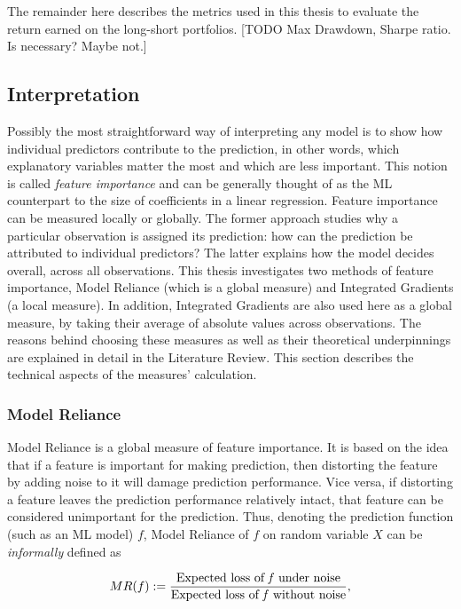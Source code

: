 			The remainder here describes the metrics used in this thesis to evaluate the return earned on the long-short portfolios. [TODO Max Drawdown, Sharpe ratio. Is necessary? Maybe not.]
	
	
	\subsection{Interpretation}
	
		Possibly the most straightforward way of interpreting any model is to show how individual predictors contribute to the prediction, in other words, which explanatory variables matter the most and which are less important. This notion is called \textit{feature importance} and can be generally thought of as the ML counterpart to the size of coefficients in a linear regression. Feature importance can be measured locally or globally. The former approach studies why a particular observation is assigned its prediction: how can the prediction be attributed to individual predictors? The latter explains how the model decides overall, across all observations. This thesis investigates two methods of feature importance, Model Reliance \citep{fisher2019all} (which is a global measure) and Integrated Gradients \citep{sundararajan2017axiomatic} (a local measure). In addition, Integrated Gradients are also used here as a global measure, by taking their average of absolute values across observations. The reasons behind choosing these measures as well as their theoretical underpinnings are explained in detail in the Literature Review. This section describes the technical aspects of the measures' calculation.
		
		\subsubsection{Model Reliance}
			Model Reliance \citep{fisher2019all} is a global measure of feature importance. It is based on the idea that if a feature is important for making prediction, then distorting the feature by adding noise to it will damage prediction performance. Vice versa, if distorting a feature leaves the prediction performance relatively intact, that feature can be considered unimportant for the prediction. Thus, denoting  the prediction function (such as an ML model) $f$, Model Reliance of  $f$ on random variable $X$ can be \textit{informally} defined as
			
			\begin{equation*}
				MR(f):=\frac{\text{Expected loss of \textit{f} under noise}}{\text{Expected loss of \textit{f} without noise}},
			\end{equation*}
			
